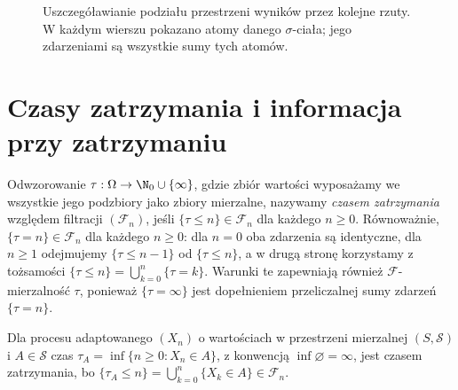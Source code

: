 \begin{figure}[htbp]
\centering
{}
\caption{Uszczegóławianie podziału przestrzeni wyników
przez kolejne rzuty. W każdym wierszu pokazano
atomy danego $\sigma$-ciała; jego zdarzeniami
są wszystkie sumy tych atomów.}
\label{fig:rp1-13-filtration}
\end{figure}


\section{Czasy zatrzymania i informacja przy zatrzymaniu}

\begin{definicja}
Odwzorowanie $\tau:\Omega\to\N_0\cup\{\infty\}$,
gdzie zbiór wartości wyposażamy we wszystkie jego
podzbiory jako zbiory mierzalne, nazywamy
\emph{czasem zatrzymania} względem filtracji
$(\mathcal F_n)$, jeśli $\{\tau\leq n\}\in\mathcal F_n$
dla każdego $n\geq0$. Równoważnie,
$\{\tau=n\}\in\mathcal F_n$ dla każdego $n\geq0$:
dla $n=0$ oba zdarzenia są identyczne, dla $n\geq1$
odejmujemy $\{\tau\leq n-1\}$ od $\{\tau\leq n\}$,
a w drugą stronę korzystamy z tożsamości
$\{\tau\leq n\}=\bigcup_{k=0}^n\{\tau=k\}$.
Warunki te zapewniają również $\mathcal F$-mierzalność
$\tau$, ponieważ $\{\tau=\infty\}$ jest dopełnieniem
przeliczalnej sumy zdarzeń $\{\tau=n\}$.
\end{definicja}

\begin{przyklad}
Dla procesu adaptowanego $(X_n)$ o wartościach
w przestrzeni mierzalnej $(S,\mathcal S)$ i
$A\in\mathcal S$ czas
$\tau_A=\inf\{n\geq0:X_n\in A\}$, z konwencją
$\inf\varnothing=\infty$, jest czasem zatrzymania, bo
$\{\tau_A\leq n\}=\bigcup_{k=0}^n\{X_k\in A\}
\in\mathcal F_n$.
\end{przyklad}

